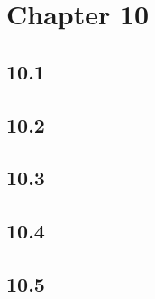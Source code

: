 \section{Chapter 10}
\subsection{10.1}

\subsection{10.2}

\subsection{10.3}

\subsection{10.4}

\subsection{10.5}
